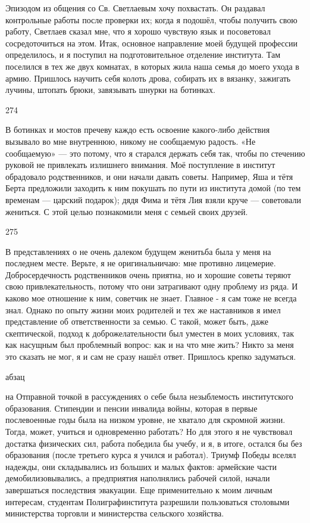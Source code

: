 Эпизодом из общения со Св. Светлаевым хочу похвастать. Он раздавал контрольные работы после проверки их; когда я подошёл, чтобы получить свою работу, Светлаев сказал мне, что я хорошо чувствую язык и посоветовал сосредоточиться на этом. Итак, основное направление моей будущей профессии определилось, и я поступил на подготовительное отделение института. Там поселился в тех же двух комнатах, в которых жила наша семья до моего ухода в армию. Пришлось научить себя колоть дрова, собирать их в вязанку, зажигать лучины, штопать брюки, завязывать шнурки на ботинках.

274

В ботинках и мостов пречеву каждо есть освоение какого-либо действия вызывало во мне внутреннюю, никому не сообщаемую радость. «Не сообщаемую» — это потому, что я старался держать себя так, чтобы по стечению руковой не привлекать излишнего внимания. Моё поступление в институт обрадовало родственников, и они начали давать советы. Например, Яша и тётя Берта предложили заходить к ним покушать по пути из института домой (по тем временам — царский подарок); дядя Фима и тётя Лия взяли круче — советовали жениться. С этой целью познакомили меня с семьей своих друзей.

275

В представлениях о не очень далеком будущем женитьба была у меня на последнем месте. Верьте, я не оригинальничаю: мне противно лицемерие. Добросердечность родственников очень приятна, но и хорошие советы теряют свою привлекательность, потому что они затрагивают одну проблему из ряда. И каково мое отношение к ним, советчик не знает. Главное - я сам тоже не всегда знал. Однако по опыту жизни моих родителей и тех же наставников я имел представление об ответственности за семью. С такой, может быть, даже скептической, подход к доброжелательности был уместен в моих условиях, так как насущным был проблемный вопрос: как и на что мне жить? Никто за меня это сказать не мог, я и сам не сразу нашёл ответ. Пришлось крепко задуматься.

абзац

на Отправной точкой в рассуждениях о себе была незыблемость институтского образования. Стипендии и пенсии инвалида войны, которая в первые послевоенные годы была на низком уровне, не хватало для скромной жизни. Тогда, может, учиться и одновременно работать? Но для этого я не чувствовал достатка физических сил, работа победила бы учебу, и я, в итоге, остался бы без образования (после третьего курса я учился и работал). Триумф Победы вселял надежды, они складывались из больших и малых фактов: армейские части демобилизовывались, а предприятия наполнялись рабочей силой, начали завершаться последствия эвакуации. Еще применительно к моим личным интересам, студентам Полиграфинститута разрешили пользоваться столовыми министерства торговли и министерства сельского хозяйства.


